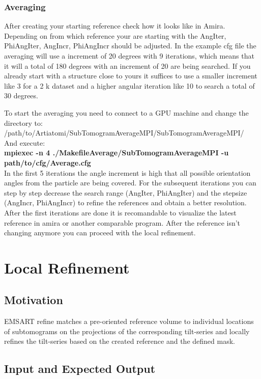 \documentclass[12pt,a4paper]{scrartcl}
\begin{document}
{\subsubsection{Averaging}
After creating your starting reference check how it looks like in Amira. Depending on from which reference your are starting with the AngIter, PhiAngIter, AngIncr, PhiAngIncr should be adjusted. In the example cfg file the averaging will use a increment of 20 degrees with 9 iterations, which means that it will a total of 180 degrees with an increment of 20 are being searched. If you already start with a structure close to yours it suffices to use a smaller increment like 3 for a 2 k dataset and a higher angular iteration like 10 to search a total of 30 degrees.   

To start the averaging you need to connect to a GPU machine and change the directory to:
/path/to/Artiatomi/SubTomogramAverageMPI/SubTomogramAverageMPI/ \\

And execute:\\ 

\textbf{mpiexec -n 4 ./MakefileAverage/SubTomogramAverageMPI -u path/to/cfg/Average.cfg}\\

In the first 5 iterations the angle increment is high that all possible orientation angles from the particle are being covered. For the subsequent iterations you can step by step decrease the search range (AngIter, PhiAngIter) and the stepsize (AngIncr, PhiAngIncr) to refine the references and obtain a better resolution. After the first iterations are done it is recomandable to visualize the latest reference in amira or another comparable program. After the reference isn’t changing anymore you can proceed with the local refinement. 



\section{Local Refinement}
\subsection{Motivation}
EMSART refine matches a pre-oriented reference volume to individual locations of subtomograms on the projections of the corresponding tilt-series and locally refines the tilt-series based on the created reference and the defined mask. 
 
\subsection{Input and Expected Output}

}
\end{document}
